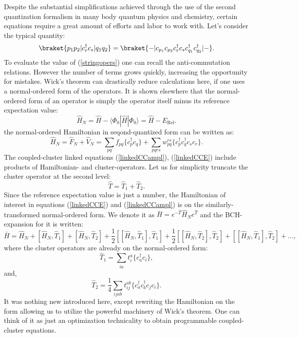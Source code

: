 \documentclass[twoside,english]{uiofysmaster}
\begin{document}
Despite the substantial simplifications achieved through the use of the second quantization formalism in many body quantum physics and chemistry, certain equations require a great amount of efforts and labor to work with. Let's consider the typical quantity:
\begin{equation}\label{stringopers}
\braket{p_1 p_2|c_r^\dag c_s|q_1 q_2} = \braket{-|c_{p_1} c_{p_2} c_r^\dag c_s c_{q_1}^\dag c_{q_2}^\dag|-}.
\end{equation}
To evaluate the value of (\ref{stringopers}) one can recall the anti-commutation relations. However the number of
terms grows quickly, increasing the opportunity for mistakes.
Wick's theorem can drastically reduce calculations here, if one uses a normal-ordered form of the operators. It is shown elsewhere\cite{CrawfordIntroductionCoupledCluster2007} that the normal-ordered form of an operator is simply the operator itself minus its reference expectation value:
\[
\hat{H}_N = \hat{H} - \langle\Phi_0 |\hat{H} |\Phi_0\rangle = \hat{H} - E_{\text{Ref}}.
\]
the normal-ordered Hamiltonian in seqond-quantized form can be written as\cite{HarrisAlgebraicdiagrammaticmethods1992}:
\begin{equation}\label{NOHAM}
\hat{H}_N = \hat{F}_N + \hat{V}_N  = \sum_{pq} f_{pq} \{c^\dagger_pc_q\} + \sum_{pqrs} w_{pq}^{rs} \{c^\dagger_pc^\dag_qc_sc_r\}.
\end{equation}
The coupled-cluster linked equations (\ref{linkedCCampl}), (\ref{linkedCCE}) include products of Hamiltonian- and cluster-operators. Let us for simplicity truncate the cluster operator at the second level:
\[
\hat{T} = \hat{T}_1 + \hat{T}_2.
\]
Since the reference expectation value is just a number, the Hamiltonian of interest in equations (\ref{linkedCCE}) and (\ref{linkedCCampl}) is on the similarly-transformed normal-ordered form. We denote it as $\bar{H} = e^{-\hat{T}}\hat{H}_Ne^{\hat{T}}$ and the BCH-expansion for it is written:
\begin{equation}
\bar{H} = \hat{H}_N + [\hat{H}_N,\hat{T}_1] + [\hat{H}_N,\hat{T}_2] +\frac{1}{2}[[\hat{H}_N,\hat{T}_1],\hat{T}_1] + \frac{1}{2}[[\hat{H}_N,\hat{T}_2],\hat{T}_2] +  [[\hat{H}_N,\hat{T}_1],\hat{T}_2] + \dots ,
\end{equation}\label{HAILT1}
where the cluster operators are already on the normal-ordered form:
\[ 
\hat{T}_1 = \sum_{ia}t_{i}^{a}\{ c^\dag_{a} c_{i}\},
\]
and,
\[ 
\hat{T}_2 = \frac{1}{4}\sum_{ijab}t_{ij}^{ab} \{ c^\dag_{a} c^\dag_{b} c_{j} c_{i} \}.
\]
It was nothing new introduced here, except rewriting the Hamiltonian on the form allowing us to utilize the powerful machinery of Wick's theorem. One can think of it as just an optimization technicality to obtain programmable coupled-cluster equations.
\end{document}

